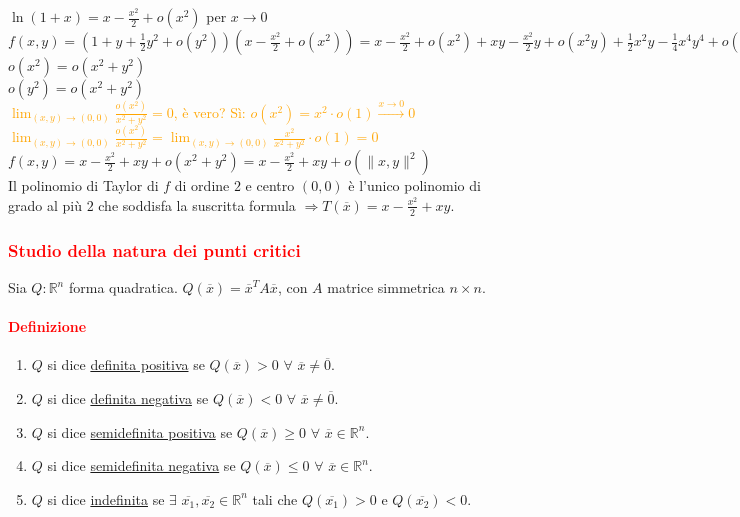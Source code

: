 \documentclass{article}
\newcommand{\R}{\mathbb{R}}
\begin{document}
$\ln(1+x)=x-\frac{x^2}{2}+o(x^2)$ per $x \rightarrow 0$\\
$f(x,y)=(1+y+\frac{1}{2}y^2+o(y^2))(x-\frac{x^2}{2}+o(x^2))=x-\frac{x^2}{2}+o(x^2)+xy-\frac{x^2}{2}y+o(x^2y)+\frac{1}{2}x^2y-\frac{1}{4}x^4y^4+o(x^2y^2)+o(y^2)=x-\frac{x^2}{2}+xy+\left[ -\frac{1}{4}x^4y^4+o(x^2)+o(y^2) \right]$
$o(x^2)=o(x^2+y^2)$\\
$o(y^2)=o(x^2+y^2)$\\
\textcolor{orange}{$\lim_{(x,y)\rightarrow(0,0)}\frac{o(x^2)}{x^2+y^2}=0$, è vero? Sì: $o(x^2)=x^2\cdot o(1)\xrightarrow{x \rightarrow 0}0$\\
$\lim_{(x,y)\rightarrow(0,0)}\frac{o(x^2)}{x^2+y^2}=\lim_{(x,y)\rightarrow(0,0)}\frac{x^2}{x^2+y^2}\cdot o(1)=0$}\\
$f(x,y)=x-\frac{x^2}{2}+xy+o(x^2+y^2)=x-\frac{x^2}{2}+xy+o(\|x,y\|^2)$\\
Il polinomio di Taylor di $f$ di ordine $2$ e centro $(0,0)$ è l'unico polinomio di grado al più $2$ che soddisfa la suscritta formula $\Rightarrow T(\overline{x})=x-\frac{x^2}{2}+xy$.

\subsubsection{\textcolor{red}{Studio della natura dei punti critici}}
Sia $Q: \R^n$ forma quadratica. $Q(\overline{x})=\overline{x}^T A \overline{x}$, con $A$ matrice simmetrica $n\times n$.
\paragraph{\textcolor{red}{Definizione}}
\begin{enumerate}
    \item $Q$ si dice \underline{definita positiva} se $Q(\overline{x}) >0\,\, \forall\,\, \overline{x} \neq \overline{0}$.
    \item $Q$ si dice \underline{definita negativa} se $Q(\overline{x})<0 \,\, \forall \,\, \overline{x} \neq \overline{0}$.
    \item $Q$ si dice \underline{semidefinita positiva} se $Q(\overline{x})\geq 0 \,\, \forall \,\, \overline{x} \in \R^n$.
    \item $Q$ si dice \underline{semidefinita negativa} se $Q(\overline{x})\leq 0 \,\, \forall \,\, \overline{x} \in \R^n$.
    \item $Q$ si dice \underline{indefinita} se $\exists \,\,\overline{x_1},\overline{x_2}\in \R^{n}$ tali che $Q(\overline{x_1})>0$ e $Q(\overline{x_2})<0$.
\end{enumerate}
\end{document}

